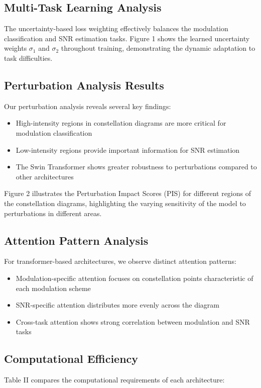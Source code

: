 \documentclass{ELSP}
\begin{document}
\subsection{Multi-Task Learning Analysis}
The uncertainty-based loss weighting effectively balances the modulation classification and SNR estimation tasks. Figure 1 shows the learned uncertainty weights $\sigma_1$ and $\sigma_2$ throughout training, demonstrating the dynamic adaptation to task difficulties.

\subsection{Perturbation Analysis Results}
Our perturbation analysis reveals several key findings:

\begin{itemize}
    \item High-intensity regions in constellation diagrams are more critical for modulation classification
    \item Low-intensity regions provide important information for SNR estimation
    \item The Swin Transformer shows greater robustness to perturbations compared to other architectures
\end{itemize}

Figure 2 illustrates the Perturbation Impact Scores (PIS) for different regions of the constellation diagrams, highlighting the varying sensitivity of the model to perturbations in different areas.

\subsection{Attention Pattern Analysis}
For transformer-based architectures, we observe distinct attention patterns:

\begin{itemize}
    \item Modulation-specific attention focuses on constellation points characteristic of each modulation scheme
    \item SNR-specific attention distributes more evenly across the diagram
    \item Cross-task attention shows strong correlation between modulation and SNR tasks
\end{itemize}

\subsection{Computational Efficiency}
Table II compares the computational requirements of each architecture:
\end{document}
